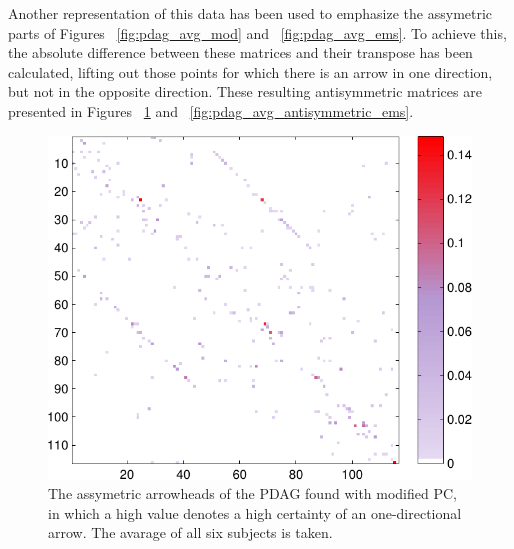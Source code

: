 \documentclass[a4paper, 10pt, english, onecolumn]{article}
\begin{document}
Another representation of this data has been used to emphasize the assymetric parts of Figures ~\ref{fig:pdag_avg_mod} and ~\ref{fig:pdag_avg_ems}.
To achieve this, the absolute difference between these matrices and their transpose has been calculated, lifting out those points for which there is an arrow in one direction, but not in the opposite direction.
These resulting antisymmetric matrices are presented in Figures ~\ref{fig:pdag_avg_antisymmetric_mod} and ~\ref{fig:pdag_avg_antisymmetric_ems}.

\begin{figure}[h!]
  \centering
  \includegraphics{images/arrowheads_avg_mod}
  \caption{The assymetric arrowheads of the PDAG found with modified PC, in which a high value denotes a high certainty of an one-directional arrow. The avarage of all six subjects is taken.}
  \label{fig:pdag_avg_antisymmetric_mod}
\end{figure}
\end{document}
